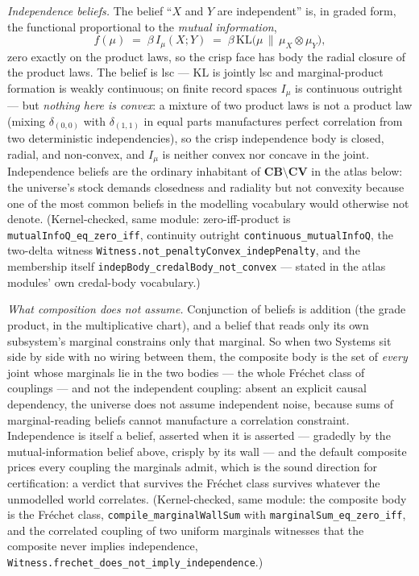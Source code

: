 \begin{example}
\emph{Independence beliefs.} The belief ``$X$ and $Y$ are
independent'' is, in graded form, the functional proportional to the
\emph{mutual information},
\[
  f(\mu) \;=\; \beta\, I_{\mu}(X; Y)
  \;=\; \beta\, \mathrm{KL}\bigl(\mu \,\big\|\,
    \mu_X \otimes \mu_Y\bigr),
\]
zero exactly on the product laws, so the crisp face has body the
radial closure of the product laws. The belief is lsc ---
$\mathrm{KL}$ is jointly lsc and marginal-product formation is
weakly continuous; on finite record spaces $I_{\mu}$ is continuous
outright --- but \emph{nothing here is convex}: a mixture of two
product laws is not a product law (mixing $\delta_{(0,0)}$ with
$\delta_{(1,1)}$ in equal parts manufactures perfect correlation
from two deterministic independencies), so the crisp independence
body is closed, radial, and non-convex, and $I_{\mu}$ is neither
convex nor concave in the joint. Independence beliefs are the
ordinary inhabitant of $\mathbf{CB} \setminus \mathbf{CV}$ in the
atlas below: the universe's stock demands closedness and radiality
but not convexity because one of the most common beliefs in the
modelling vocabulary would otherwise not denote. (Kernel-checked,
same module: zero-iff-product is \texttt{mutualInfoQ\_eq\_zero\_iff},
continuity outright \texttt{continuous\_mutualInfoQ}, the two-delta
witness \texttt{Witness.not\_penaltyConvex\_indepPenalty}, and the
membership itself \texttt{indepBody\_credalBody\_not\_convex} ---
stated in the atlas modules' own credal-body vocabulary.)

\emph{What composition does not assume.} Conjunction of beliefs is
addition (the grade product, in the multiplicative
chart), and a belief that reads only its own subsystem's marginal
constrains only that marginal. So when two Systems sit side by side
with no wiring between them, the composite body is the set of
\emph{every} joint whose marginals lie in the two bodies --- the
whole Fr\'echet class of couplings --- and not the independent
coupling: absent an explicit causal dependency, the universe does
not assume independent noise, because sums of marginal-reading
beliefs cannot manufacture a correlation constraint. Independence
is itself a belief, asserted when it is asserted --- gradedly by
the mutual-information belief above, crisply by its wall --- and
the default composite prices every coupling the marginals admit,
which is the sound direction for certification: a verdict that
survives the Fr\'echet class survives whatever the unmodelled world
correlates. (Kernel-checked, same module: the composite body is the
Fr\'echet class, \texttt{compile\_marginalWallSum} with
\texttt{marginalSum\_eq\_zero\_iff}, and the correlated coupling of
two uniform marginals witnesses that the composite never implies
independence,
\texttt{Witness.frechet\_does\_not\_imply\_independence}.)
\end{example}

